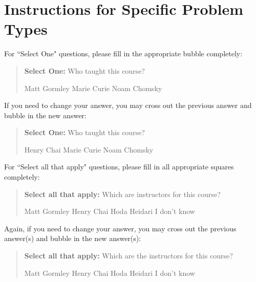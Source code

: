 \documentclass[11pt,addpoints,answers]{exam}
\newcommand{\blackcircle}{\tikz\draw[black,fill=black] (0,0) circle (1ex);}
\begin{document}
\section*{Instructions for Specific Problem Types}

For ``Select One" questions, please fill in the appropriate bubble completely:

\begin{quote}
\textbf{Select One:} Who taught this course?
    \begin{checkboxes}
     \CorrectChoice Matt Gormley
     \choice Marie Curie
     \choice Noam Chomsky
    \end{checkboxes}
\end{quote}

If you need to change your answer, you may cross out the previous answer and bubble in the new answer:

\begin{quote}
\textbf{Select One:} Who taught this course?
    {
    \begin{checkboxes}
     \CorrectChoice Henry Chai
     \choice Marie Curie \checkboxchar{\xcancel{\blackcircle}{}}
     \choice Noam Chomsky
    \end{checkboxes}
    }
\end{quote}

For ``Select all that apply" questions, please fill in all appropriate squares completely:

\begin{quote}
\textbf{Select all that apply:} Which are instructors for this course?
    {%
    \checkboxchar{$\Box$} \checkedchar{$\blacksquare$} %
    \begin{checkboxes}
    \CorrectChoice Matt Gormley  
    \CorrectChoice Henry Chai
    \CorrectChoice Hoda Heidari
    \choice I don't know
    \end{checkboxes}
    }
\end{quote}

Again, if you need to change your answer, you may cross out the previous answer(s) and bubble in the new answer(s):

\begin{quote}
\textbf{Select all that apply:} Which are the instructors for this course?
    {%
    \checkboxchar{\xcancel{$\blacksquare$}} \checkedchar{$\blacksquare$} %
    \begin{checkboxes}
    \CorrectChoice Matt Gormley 
    \CorrectChoice Henry Chai
    \CorrectChoice Hoda Heidari
    \choice I don't know
    \end{checkboxes}
    }
\end{quote}
\end{document}
